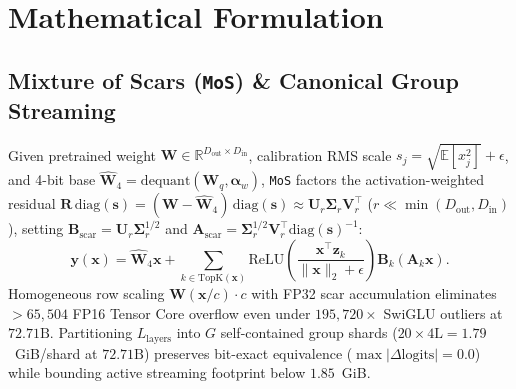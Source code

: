 \documentclass[10pt,twocolumn]{article}
\begin{document}
\section{Mathematical Formulation}

\subsection{Mixture of Scars (\texttt{MoS}) \& Canonical Group Streaming}
Given pretrained weight $\mathbf{W} \in \mathbb{R}^{D_{\text{out}} \times D_{\text{in}}}$, calibration RMS scale $s_j = \sqrt{\mathbb{E}[x_j^2]} + \epsilon$, and 4-bit base $\widehat{\mathbf{W}}_4 = \mathrm{dequant}(\mathbf{W}_q, \boldsymbol{\alpha}_w)$, \texttt{MoS} factors the activation-weighted residual $\mathbf{R}\,\mathrm{diag}(\mathbf{s}) = (\mathbf{W} - \widehat{\mathbf{W}}_4)\,\mathrm{diag}(\mathbf{s}) \approx \mathbf{U}_r \boldsymbol{\Sigma}_r \mathbf{V}_r^\top$ ($r \ll \min(D_{\text{out}}, D_{\text{in}})$), setting $\mathbf{B}_{\text{scar}} = \mathbf{U}_r \boldsymbol{\Sigma}_r^{1/2}$ and $\mathbf{A}_{\text{scar}} = \boldsymbol{\Sigma}_r^{1/2} \mathbf{V}_r^\top \mathrm{diag}(\mathbf{s})^{-1}$:
\begin{equation}
    \mathbf{y}(\mathbf{x}) = \widehat{\mathbf{W}}_4 \mathbf{x} + \sum_{k \in \mathrm{TopK}(\mathbf{x})} \mathrm{ReLU}\!\left(\frac{\mathbf{x}^\top \mathbf{z}_k}{\|\mathbf{x}\|_2 + \epsilon}\right) \mathbf{B}_{k} (\mathbf{A}_{k} \mathbf{x}).
    \label{eq:mos}
\end{equation}
Homogeneous row scaling $\mathbf{W}(\mathbf{x}/c)\cdot c$ with FP32 scar accumulation eliminates $>65{,}504$ FP16 Tensor Core overflow even under $195{,}720\times$ SwiGLU outliers at $72.71\text{B}$. Partitioning $L_{\text{layers}}$ into $G$ self-contained group shards ($20 \times 4\text{L} = 1.79$~GiB/shard at $72.71\text{B}$) preserves bit-exact equivalence ($\max|\Delta\text{logits}| = 0.0$) while bounding active streaming footprint below $1.85$~GiB.
\end{document}
